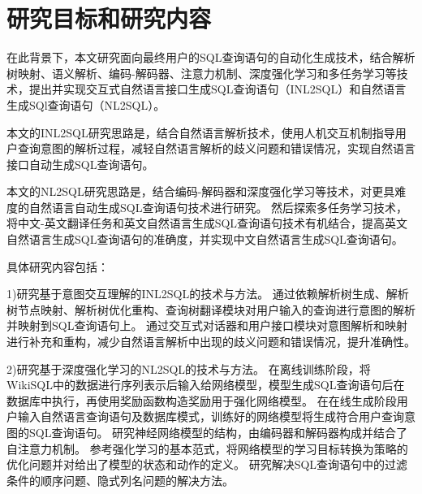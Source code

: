 

\section{研究目标和研究内容}
\label{intro:targetandcontent}
在此背景下，本文研究面向最终用户的SQL查询语句的自动化生成技术，结合解析树映射、语义解析、编码-解码器、注意力机制、深度强化学习和多任务学习等技术，提出并实现交互式自然语言接口生成SQL查询语句（INL2SQL）和自然语言生成SQl查询语句（NL2SQL）。

本文的INL2SQL研究思路是，结合自然语言解析技术，使用人机交互机制指导用户查询意图的解析过程，减轻自然语言解析的歧义问题和错误情况，实现自然语言接口自动生成SQL查询语句。

本文的NL2SQL研究思路是，结合编码-解码器和深度强化学习等技术，对更具难度的自然语言自动生成SQL查询语句技术进行研究。
然后探索多任务学习技术，将中文-英文翻译任务和英文自然语言生成SQL查询语句技术有机结合，提高英文自然语言生成SQL查询语句的准确度，并实现中文自然语言生成SQL查询语句。

具体研究内容包括：

1)研究基于意图交互理解的INL2SQL的技术与方法。
通过依赖解析树生成、解析树节点映射、解析树优化重构、查询树翻译模块对用户输入的查询进行意图的解析并映射到SQL查询语句上。
通过交互式对话器和用户接口模块对意图解析和映射进行补充和重构，减少自然语言解析中出现的歧义问题和错误情况，提升准确性。

2)研究基于深度强化学习的NL2SQL的技术与方法。
在离线训练阶段，将WikiSQL中的数据进行序列表示后输入给网络模型，模型生成SQL查询语句后在数据库中执行，再使用奖励函数构造奖励用于强化网络模型。
在在线生成阶段用户输入自然语言查询语句及数据库模式，训练好的网络模型将生成符合用户查询意图的SQL查询语句。
研究神经网络模型的结构，由编码器和解码器构成并结合了自注意力机制。
参考强化学习的基本范式，将网络模型的学习目标转换为策略的优化问题并对给出了模型的状态和动作的定义。
研究解决SQL查询语句中的过滤条件的顺序问题、隐式列名问题的解决方法。

